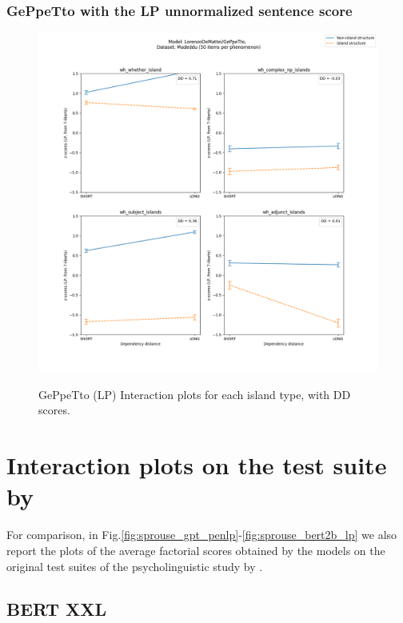 \subsubsection{GePpeTto with the LP unnormalized sentence score}
\begin{figure}[h]
	\centering
	\includegraphics[width=1\textwidth]{images/AppendixA/Madeddu_wh_LorenzoDeMattei_GePpeTto_LP-zscores-likert-2022-09-14_h15m28s58.png} 
	\label{A-fig:md_gpt_lp}
	\caption{GePpeTto (LP) Interaction plots for each island type, with DD scores.}
\end{figure}


\clearpage
\section{Interaction plots on the test suite by \citet{sprouse2016experimental}}

For comparison, in Fig.\ref{fig:sprouse_gpt_penlp}-\ref{fig:sprouse_bert2b_lp} we also report the plots of the average factorial scores obtained by the models on the original test suites of the psycholinguistic study by \citet{sprouse2016experimental}.


\subsection{BERT XXL}
